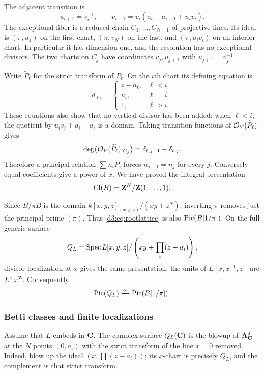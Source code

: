 The adjacent transition is
\[
u_{i+1}=v_i^{-1},\qquad
v_{i+1}=v_i(a_i-a_{i+1}+u_i v_i).
\]
The exceptional fiber is a reduced chain $C_1,\ldots,C_{N-1}$ of projective lines. Its ideal is $(\pi,u_1)$ on the first chart, $(\pi,v_N)$ on the last, and $(\pi,u_i v_i)$ on an interior chart. In particular it has dimension one, and the resolution has no exceptional divisors. The two charts on $C_j$ have coordinates $v_j,u_{j+1}$ with $u_{j+1}=v_j^{-1}$.

Write $\widetilde P_\ell$ for the strict transform of $P_\ell$. On the $i$th chart its defining equation is
\[
d_{\ell i}=\begin{cases}
z-a_\ell,&\ell<i,\\
u_i,&\ell=i,\\
1,&\ell>i.
\end{cases}
\]
These equations also show that no vertical divisor has been added: when $\ell<i$, the quotient by $u_i v_i+a_i-a_\ell$ is a domain. Taking transition functions of $\mathcal O_Y(\widetilde P_\ell)$ gives
\[
\deg\bigl(\mathcal O_Y(\widetilde P_\ell)|_{C_j}\bigr)
=\delta_{\ell,j+1}-\delta_{\ell,j}.
\]
Therefore a principal relation $\sum n_iP_i$ forces $n_{j+1}=n_j$ for every $j$. Conversely equal coefficients give a power of $x$. We have proved the integral presentation
\begin{equation}\label{d3:eq:rootlattice}
\operatorname{Cl}(B)=\mathbf Z^N/\mathbf Z(1,\ldots,1).
\end{equation}

Since $B/\pi B$ is the domain $k[x,y,z]_{(x,y,z)}/(xy+z^N)$, inverting $\pi$ removes just the principal prime $(\pi)$. Thus \eqref{d3:eq:rootlattice} is also $\operatorname{Pic}(B[1/\pi])$. On the full generic surface
\[
Q_L=\operatorname{Spec} L[x,y,z]/\left(xy+\prod_i(z-a_i)\right),
\]
divisor localization at $x$ gives the same presentation: the units of $L[x,x^{-1},z]$ are $L^\times x^{\mathbf Z}$. Consequently
\begin{equation}\label{d3:eq:generalpiciso}
\operatorname{Pic}(Q_L)\xrightarrow{\sim}\operatorname{Pic}(B[1/\pi]).
\end{equation}

\subsubsection{Betti classes and finite localizations}

Assume that $L$ embeds in $\mathbf C$. The complex surface $Q_L(\mathbf C)$ is the blowup of $\mathbf A^2_{\mathbf C}$ at the $N$ points $(0,a_i)$ with the strict transform of the line $x=0$ removed. Indeed, blow up the ideal $(x,\prod(z-a_i))$; its $x$-chart is precisely $Q_L$, and the complement is that strict transform.


